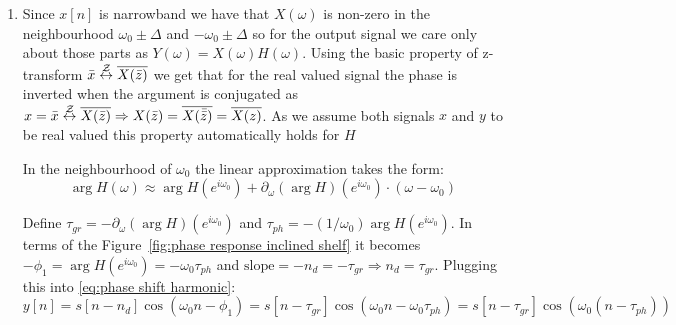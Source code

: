 \begin{enumerate}
    \item Since $x[n]$ is narrowband we have that $X(\omega)$ is non-zero in the neighbourhood $\omega_0 \pm \Delta$ and $-\omega_0 \pm \Delta$ so for the output signal we care only about those parts as $Y(\omega) = X(\omega) H(\omega)$. Using the basic property of z-transform $\bar{x} \overset{\mathcal{Z}}{\leftrightarrow} \overline{X(\bar{z})}$ we get that for the real valued signal the phase is inverted when the argument is conjugated as $x = \bar{x} \overset{\mathcal{Z}}{\leftrightarrow} \overline{X(\bar{z})} \Rightarrow X(\bar{z}) = \overline{X(\bar{\bar{z}})} = \overline{X(z)}$. As we assume both signals $x$ and $y$ to be real valued this property automatically holds for $H$

          In the neighbourhood of $\omega_0$ the linear approximation takes the form:
          \[\arg H(\omega) \approx \arg H(e^{i\omega_0}) + \partial_\omega(\arg H)(e^{i\omega_0}) \cdot (\omega - \omega_0)\]

          Define $\tau_{gr} = -\partial_\omega(\arg H) (e^{i\omega_0})$ and $\tau_{ph} = -(1 / \omega_0) \arg H(e^{i\omega_0})$. In terms of the Figure~\ref{fig:phase response inclined shelf} it becomes $-\phi_1 = \arg H(e^{i\omega_0}) = -\omega_0 \tau_{ph}$ and $\text{slope} = -n_d = -\tau_{gr} \Rightarrow n_d = \tau_{gr}$. Plugging this into \eqref{eq:phase shift harmonic}:
          \begin{equation} \label{eq:group delay}
              y[n] = s[n - n_d] \cos(\omega_0 n - \phi_1)
              = s[n - \tau_{gr}] \cos(\omega_0 n - \omega_0 \tau_{ph})
              = s[n - \tau_{gr}] \cos(\omega_0 (n -  \tau_{ph}))
          \end{equation}
\end{enumerate}

